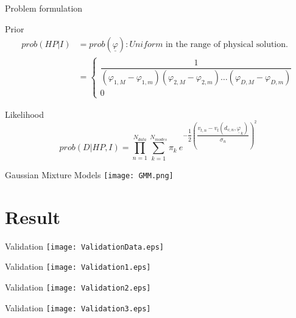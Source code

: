 \documentclass{beamer}
\begin{document}
	\begin{frame}{Problem formulation}
		\begin{block}{Prior}
			\begin{equation*}
				\begin{split}			
				prob(HP|I) & = prob(\underline{\varphi}) : \textit{Uniform} \text{ in the range of physical solution.}\\
				& = \left\{ 
				\begin{array}{cc}
				\dfrac{1}{(\varphi_{1, M} - \varphi_{1, m}) (\varphi_{2, M} - \varphi_{2, m}) \dots (\varphi_{D, M} - \varphi_{D, m})} \\
				0 
				\end{array} \right.
				\end{split}
			\end{equation*}				
		\end{block}
		
		\begin{block}{Likelihood}
			\begin{equation*}
				prob(D|HP,I) = \prod_{n = 1}^{N_{data}} \sum_{k = 1}^{N_{modes}} \pi_k \ e^{-\dfrac{1}{2} \left(\dfrac{v_{t,n} - v_t(d_{v,n}, \underline{\varphi}_k)}{\sigma_n} \right)^2}
			\end{equation*}
		\end{block}	
	\end{frame}

	\begin{frame}{Gaussian Mixture Models}
		\centering
		\texttt{[image: GMM.png]}
	\end{frame}

\section{Result}
	\begin{frame}{Validation}
		\centering
		\texttt{[image: ValidationData.eps]}
	\end{frame}

	\begin{frame}{Validation}
		\centering
		\texttt{[image: Validation1.eps]}
	\end{frame}

	\begin{frame}{Validation}
		\centering
		\texttt{[image: Validation2.eps]}
	\end{frame}

	\begin{frame}{Validation}
		\centering
		\texttt{[image: Validation3.eps]}
	\end{frame}
\end{document}
